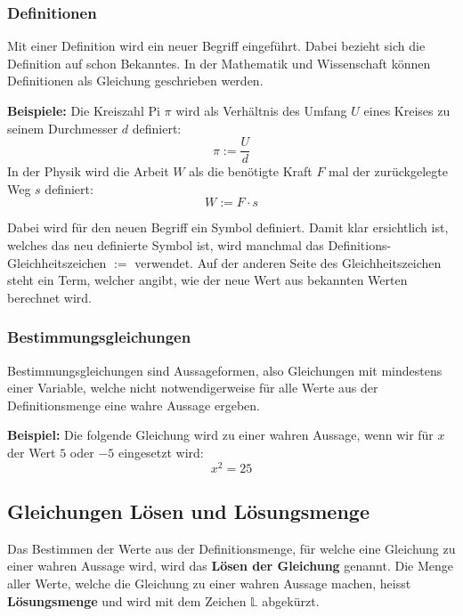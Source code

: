 \subsubsection{Definitionen}

Mit einer Definition wird ein neuer Begriff eingeführt. Dabei bezieht sich die Definition auf schon Bekanntes. In der Mathematik und Wissenschaft können Definitionen als Gleichung geschrieben werden.
\begin{example}
  \textbf{Beispiele:} Die Kreiszahl Pi $\pi$ wird als Verhältnis des Umfang $U$ eines Kreises zu seinem Durchmesser $d$ definiert:
  \[
    \pi := \frac{U}{d}
  \]
  In der Physik wird die Arbeit $W$ als die benötigte Kraft $F$ mal der zurückgelegte Weg $s$ definiert:
  \[
    W := F\cdot s
  \]
\end{example}
Dabei wird für den neuen Begriff ein Symbol definiert. Damit klar ersichtlich ist, welches das neu definierte Symbol ist, wird manchmal das Definitions-Gleichheitszeichen $:=$ verwendet. Auf der anderen Seite des Gleichheitszeichen steht ein Term, welcher angibt, wie der neue Wert aus bekannten Werten berechnet wird.

\subsubsection{Bestimmungsgleichungen}

Bestimmungsgleichungen sind Aussageformen, also Gleichungen mit mindestens einer Variable, welche nicht notwendigerweise für alle Werte aus der Definitionsmenge eine wahre Aussage ergeben.
\begin{example}
  \textbf{Beispiel:} Die folgende Gleichung wird zu einer wahren Aussage, wenn wir für $x$ der Wert $5$ oder $-5$ eingesetzt wird:
  \[
    x^2 = 25
  \]
\end{example}

\subsection{Gleichungen Lösen und Lösungsmenge}

Das Bestimmen der Werte aus der Definitionsmenge, für welche eine Gleichung zu einer wahren Aussage wird, wird das \textbf{Lösen der Gleichung} genannt. Die Menge aller Werte, welche die Gleichung zu einer wahren Aussage machen, heisst \textbf{Lösungsmenge} und wird mit dem Zeichen $\mathbb{L}$ abgekürzt.


